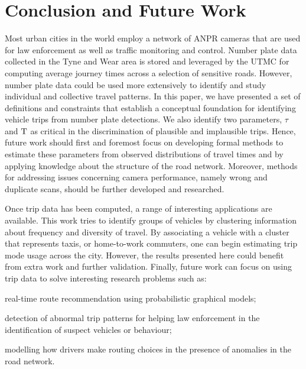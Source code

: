 \section{Conclusion and Future Work}\label{s.conclusions}

Most urban cities in the world employ a network of ANPR cameras that are used for law enforcement as well as traffic monitoring and control. Number plate data collected in the Tyne and Wear area is stored and leveraged by the UTMC for computing average journey times across a selection of sensitive roads. However, number plate data could be used more extensively to identify and study individual and collective travel patterns. In this paper, we have presented a set of definitions and constraints that establish a conceptual foundation for identifying vehicle trips from number plate detections. We also identify two parameters, $\tau$ and $\mathrm{T}$ as critical in the discrimination of plausible and implausible trips. Hence, future work should first and foremost focus on developing formal methods to estimate these parameters from observed distributions of travel times and by applying knowledge about the structure of the road network. Moreover, methods for addressing issues concerning camera performance, namely wrong and duplicate scans, should be further developed and researched.

Once trip data has been computed, a range of interesting applications are available. This work tries to identify groups of vehicles by clustering information about frequency and diversity of travel. By associating a vehicle with a cluster that represents taxis, or home-to-work commuters, one can begin estimating trip mode usage across the city. However, the results presented here could benefit from extra work and further validation. Finally, future work can focus on using trip data to solve interesting research problems such as:
\begin{enumerate*}[label=(\roman*)]
  \item real-time route recommendation using probabilistic graphical models;
  \item detection of abnormal trip patterns for helping law enforcement in the identification of suspect vehicles or behaviour;
  \item modelling how drivers make routing choices in the presence of anomalies in the road network.
\end{enumerate*}

